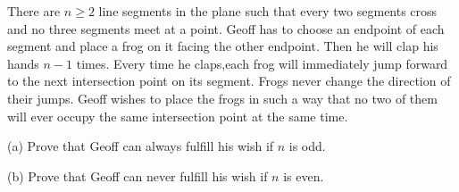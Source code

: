 There are 
$n\ge 2$
 line segments in the plane such that every two segments cross and no three segments meet at a point. Geoff has to choose an endpoint of each segment and place a frog on it facing the other endpoint. Then he will clap his hands 
$n-1$
 times. Every time he claps,each frog will immediately jump forward to the next intersection point on its segment. Frogs never change the direction of their jumps. Geoff wishes to place the frogs in such a way that no two of them will ever occupy the same intersection point at the same time.


(a) Prove that Geoff can always fulfill his wish if 
$n$
 is odd.


(b) Prove that Geoff can never fulfill his wish if 
$n$
 is even.
